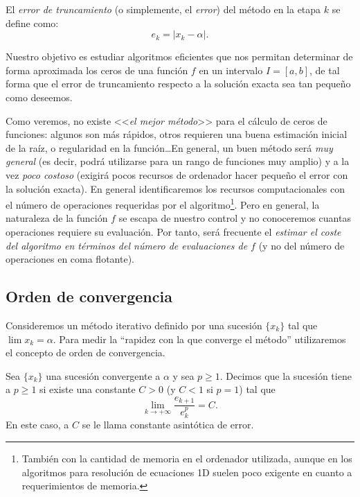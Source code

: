 El \textit{error de truncamiento} (o simplemente, el
\textit{error}) del método en la etapa $k$ se define como:
$$
e_k = |x_k - \alpha|.
$$

Nuestro objetivo es estudiar algoritmos eficientes que nos permitan
determinar de forma aproximada los ceros de una función $f$ en un
intervalo $I=[a,b]$, de tal forma que el error de truncamiento
respecto a la solución exacta sea tan pequeño como deseemos.

Como veremos, no existe <<\textit{el mejor método}>> para el cálculo
de ceros de funciones: algunos son más rápidos, otros requieren una
buena estimación inicial de la raíz, o regularidad en la función\dots En
general, un buen método será \emph{muy general} (es decir, podrá
utilizarse para un rango de funciones muy amplio) y a la vez
\emph{poco costoso} (exigirá pocos recursos de ordenador hacer pequeño
el error con la solución exacta). En general identificaremos los
recursos computacionales con el número de operaciones requeridas por
el algoritmo\footnote{También con la cantidad de memoria en el
  ordenador utilizada, aunque en los algoritmos para resolución de
  ecuaciones 1D suelen poco exigente en cuanto a requerimientos de
  memoria.}. Pero en general, la naturaleza de la función $f$ se
escapa de nuestro control y no conoceremos cuantas operaciones
requiere su evaluación.  Por tanto, será frecuente el \emph{estimar el
  coste del algoritmo en términos del número de evaluaciones de $f$}
(y no del número de operaciones en coma flotante).



\subsection*{Orden de convergencia}

Consideremos un método iterativo definido por una sucesión $\{x_k\}$
tal que $\lim x_k=\alpha$.
Para medir la ``rapidez con la que converge el método''
utilizaremos el concepto de orden de convergencia.

\begin{definition}
  \label{def:orden-convergencia}
  Sea $\{x_k\}$ una sucesión convergente a $\alpha$ y sea $p\ge
  1$.
  Decimos que la sucesión tiene  a $p\ge 1$ si existe una constante $C>0$ (y
  $C<1$ si $p=1$) tal que
  \begin{equation}
    \label{eq:orden-convergencia}
    \lim_{k\to+\infty} \frac{e_{k+1}}{e_k^p} = C.
  \end{equation}
  En este caso, a $C$ se le llama constante asintótica de error.
\end{definition}


